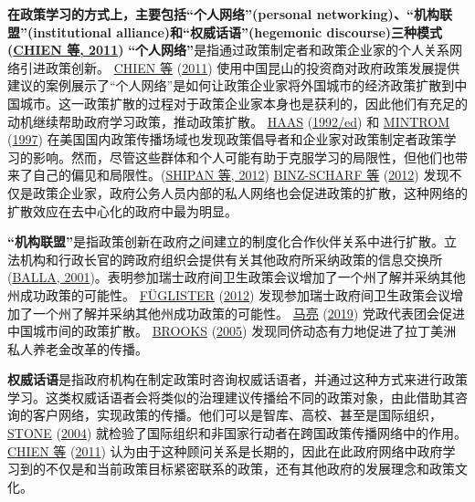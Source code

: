 \documentclass[
  12pt,
]{ctexart}
\begin{document}
\textbf{在政策学习的方式上，主要包括``个人网络''(personal networking)、``机构联盟''(institutional alliance)和``权威话语''(hegemonic discourse)三种模式(\protect\hyperlink{ref-CHIENHo2011}{CHIEN 等, 2011})}
\textbf{``个人网络''}是指通过政策制定者和政策企业家的个人关系网络引进政策创新。
\protect\hyperlink{ref-CHIENHo2011}{CHIEN 等} (\protect\hyperlink{ref-CHIENHo2011}{2011}) 使用中国昆山的投资商对政府政策发展提供建议的案例展示了``个人网络''是如何让政策企业家将外国城市的经济政策扩散到中国城市。这一政策扩散的过程对于政策企业家本身也是获利的，因此他们有充足的动机继续帮助政府学习政策，推动政策扩散。
\protect\hyperlink{ref-Haas1992}{HAAS} (\protect\hyperlink{ref-Haas1992}{1992/ed}) 和 \protect\hyperlink{ref-Mintrom1997}{MINTROM} (\protect\hyperlink{ref-Mintrom1997}{1997}) 在美国国内政策传播场域也发现政策倡导者和企业家对政策制定者政策学习的影响。然而，尽管这些群体和个人可能有助于克服学习的局限性，但他们也带来了自己的偏见和局限性。(\protect\hyperlink{ref-ShipanVolden2012}{SHIPAN 等, 2012})
\protect\hyperlink{ref-Binz-ScharfEtAl2012}{BINZ-SCHARF 等} (\protect\hyperlink{ref-Binz-ScharfEtAl2012}{2012}) 发现不仅是政策企业家，政府公务人员内部的私人网络也会促进政策的扩散，这种网络的扩散效应在去中心化的政府中最为明显。

\textbf{``机构联盟''}是指政策创新在政府之间建立的制度化合作伙伴关系中进行扩散。立法机构和行政长官的跨政府组织会提供有关其他政府所采纳政策的信息交换所(\protect\hyperlink{ref-Balla2001}{BALLA, 2001})。表明参加瑞士政府间卫生政策会议增加了一个州了解并采纳其他州成功政策的可能性。 \protect\hyperlink{ref-Fuglister2012}{FÜGLISTER} (\protect\hyperlink{ref-Fuglister2012}{2012}) 发现参加瑞士政府间卫生政策会议增加了一个州了解并采纳其他州成功政策的可能性。 \protect\hyperlink{ref-MaLiang2019}{马亮} (\protect\hyperlink{ref-MaLiang2019}{2019}) 党政代表团会促进中国城市间的政策扩散。 \protect\hyperlink{ref-Brooks2005}{BROOKS} (\protect\hyperlink{ref-Brooks2005}{2005}) 发现同侪动态有力地促进了拉丁美洲私人养老金改革的传播。

\textbf{权威话语}是指政府机构在制定政策时咨询权威话语者，并通过这种方式来进行政策学习。这类权威话语者会将类似的治理建议传播给不同的政策对象，由此借助其咨询的客户网络，实现政策的传播。他们可以是智库、高校、甚至是国际组织，\protect\hyperlink{ref-Stone2004}{STONE} (\protect\hyperlink{ref-Stone2004}{2004}) 就检验了国际组织和非国家行动者在跨国政策传播网络中的作用。\protect\hyperlink{ref-CHIENHo2011}{CHIEN 等} (\protect\hyperlink{ref-CHIENHo2011}{2011}) 认为由于这种顾问关系是长期的，因此在此政府网络中政府学习到的不仅是和当前政策目标紧密联系的政策，还有其他政府的发展理念和政策文化。
\end{document}
